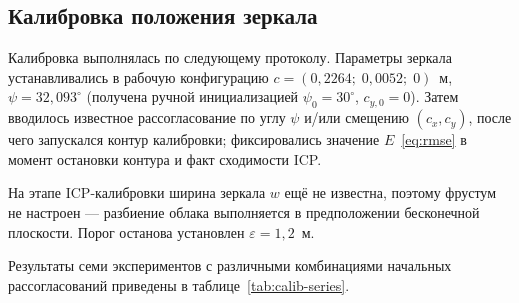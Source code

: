 \documentclass{misisarticle}
\begin{document}
\subsection{Калибровка положения зеркала}

Калибровка выполнялась по следующему протоколу. Параметры зеркала
устанавливались в рабочую конфигурацию
$c = (0{,}2264;\; 0{,}0052;\; 0)$~м, $\psi = 32{,}093^{\circ}$
(получена ручной инициализацией $\psi_0 = 30^{\circ}$,
$c_{y,0} = 0$). Затем вводилось известное рассогласование по углу
$\psi$ и/или смещению $(c_x, c_y)$, после чего запускался контур
калибровки; фиксировались значение $E$~\eqref{eq:rmse} в момент
остановки контура и факт сходимости ICP.

На этапе ICP-калибровки ширина зеркала $w$ ещё не известна, поэтому
фрустум не настроен --- разбиение облака выполняется в предположении
бесконечной плоскости. Порог останова установлен
$\varepsilon = 1{,}2$~м.

Результаты семи экспериментов с различными комбинациями начальных
рассогласований приведены в таблице~\ref{tab:calib-series}.

\begin{table}[t]
  \centering
  \caption{Результаты серии запусков контура калибровки при различных
    начальных рассогласованиях (бесконечная плоскость,
    $\varepsilon = 1{,}2$~м); $E$ --- значение~\eqref{eq:rmse} в момент
    остановки контура.}
  \label{tab:calib-series}
\end{table}
\end{document}
